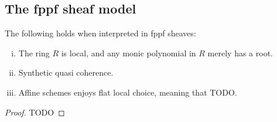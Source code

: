 \subsection{The fppf sheaf model}

\begin{theorem}
The following holds when interpreted in fppf sheaves:
\begin{enumerate}[(i)]
\item The ring $R$ is local, and any monic polynomial in $R$ merely has a root.
\item Synthetic quasi coherence.
\item Affine schemes enjoys flat local choice, meaning that TODO.
\end{enumerate}
\end{theorem}

\begin{proof}
TODO
\end{proof}


